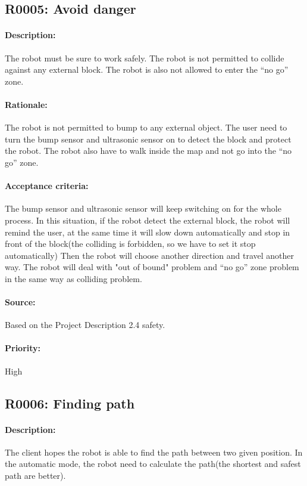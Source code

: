 \documentclass[11pt, a4paper]{report}
\begin{document}
\subsection{R0005: Avoid danger}
\paragraph{Description:}
The robot must be sure to work safely. The robot is not permitted to collide against any external block. The robot is also not allowed to enter the “no go” zone.

\paragraph{Rationale:}
The robot is not permitted to bump to any external object. The user need to turn the bump sensor and ultrasonic sensor on to detect the block and protect the robot. The robot also have to walk inside the map and not go into the “no go” zone.  

\paragraph{Acceptance criteria:}
The bump sensor and ultrasonic sensor will keep switching on for the whole process. In this situation, if the robot detect the external block, the robot will remind the user, at the same time it will slow down automatically and stop in front of the block(the colliding is forbidden, so we have to set it stop automatically) Then the robot will choose another direction and travel another way. The robot will deal with "out of bound" problem and “no go” zone problem in the same way as colliding problem.
\paragraph{Source:}
Based on the Project Description 2.4 safety.  
\paragraph{Priority:}
High


\subsection{R0006: Finding path }
\paragraph{Description:}
The client hopes the robot is able to find the path between two given position. In the automatic mode, the robot need to calculate the path(the shortest and safest path are better).    
\end{document}
